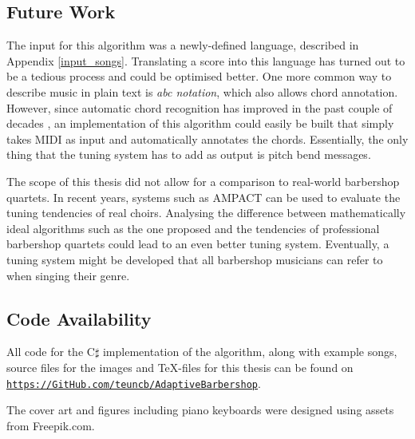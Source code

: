 \documentclass[a4paper]{article}
\begin{document}
\subsection{Future Work}
The input for this algorithm was a newly-defined language, described in Appendix \ref{input_songs}. Translating a score into this language has turned out to be a tedious process and could be optimised better. One more common way to describe music in plain text is \textit{abc notation}, which also allows chord annotation. \cite{walshaw_abc2mtex_1997} However, since automatic chord recognition has improved in the past couple of decades \cite{burgoyne_cross-validated_2007}, an implementation of this algorithm could easily be built that simply takes MIDI as input and automatically annotates the chords. Essentially, the only thing that the tuning system has to add as output is pitch bend messages.

The scope of this thesis did not allow for a comparison to real-world barbershop quartets. In recent years, systems such as AMPACT can be used to evaluate the tuning tendencies of real choirs. \cite{devaney_study_2012, chandna_deep-learning_2022} Analysing the difference between mathematically ideal algorithms such as the one proposed and the tendencies of professional barbershop quartets could lead to an even better tuning system. Eventually, a tuning system might be developed that all barbershop musicians can refer to when singing their genre.

\subsection{Code Availability}
All code for the C$\sharp$ implementation of the algorithm, along with example songs, source files for the images and \TeX-files for this thesis can be found on \texttt{\url{https://GitHub.com/teuncb/AdaptiveBarbershop}}.

% 
% 
\printbibliography
The cover art and figures including piano keyboards were designed using assets from Freepik.com.
\end{document}

